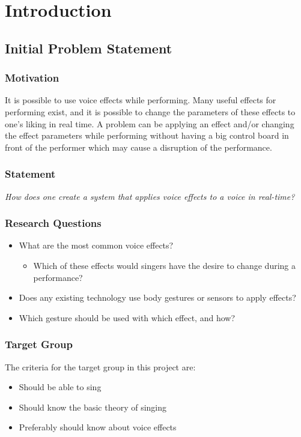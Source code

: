 \chapter{Introduction}\label{ch:Intro}

\section{Initial Problem Statement}

\subsection{Motivation}

It is possible to use voice effects while performing. Many useful effects for performing exist, and it is possible to change the parameters of these effects to one's liking in real time. 
A problem can be applying an effect and/or changing the effect parameters while performing without having a big control board in front of the performer which may cause a disruption of the performance.

\subsection{Statement}

\textit{How does one create a system that applies voice effects to a voice in real-time?}


\subsection{Research Questions}\label{sub:ResearchQ}

\begin{itemize}
	\item What are the most common voice effects?
	\begin{itemize}
		\item Which of these effects would singers have the desire to change during a performance?
	\end{itemize}
	\item Does any existing technology use body gestures or sensors to apply effects?
	\item Which gesture should be used with which effect, and how?
\end{itemize}

\subsection{Target Group}
The criteria for the target group in this project are:
\begin{itemize}
	\item Should be able to sing 
	\item Should know the basic theory of singing
	\item Preferably should know about voice effects
\end{itemize}

